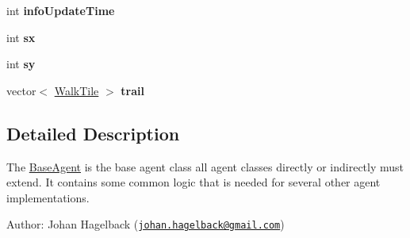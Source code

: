 \begin{DoxyCompactItemize}
\item 
\hypertarget{class_base_agent_a6204252c872f1f4dff852b87cd16b691}{int {\bfseries info\-Update\-Time}}\label{class_base_agent_a6204252c872f1f4dff852b87cd16b691}

\item 
\hypertarget{class_base_agent_aaf7d21e65ac96780aff931e56214b23b}{int {\bfseries sx}}\label{class_base_agent_aaf7d21e65ac96780aff931e56214b23b}

\item 
\hypertarget{class_base_agent_a1d4555f32a745987a09c42f085d6dc68}{int {\bfseries sy}}\label{class_base_agent_a1d4555f32a745987a09c42f085d6dc68}

\item 
\hypertarget{class_base_agent_a36c508dc8eae977d3296e0022ee868aa}{vector$<$ \hyperlink{class_walk_tile}{Walk\-Tile} $>$ {\bfseries trail}}\label{class_base_agent_a36c508dc8eae977d3296e0022ee868aa}

\end{DoxyCompactItemize}


\subsection{Detailed Description}
The \hyperlink{class_base_agent}{Base\-Agent} is the base agent class all agent classes directly or indirectly must extend. It contains some common logic that is needed for several other agent implementations.

Author\-: Johan Hagelback (\href{mailto:johan.hagelback@gmail.com}{\tt johan.\-hagelback@gmail.\-com}) 

